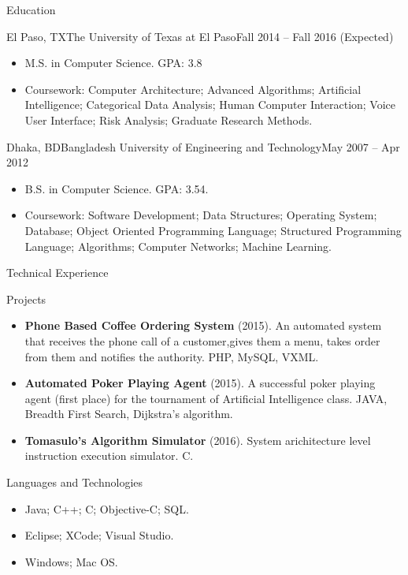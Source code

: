 \documentclass[]{mcdowellcv}
\begin{document}
	\begin{cvsection}{Education}
		\begin{cvsubsection}{El Paso, TX}{The University of Texas at El Paso}{Fall 2014 -- Fall 2016 (Expected)}
			\begin{itemize}
				\item M.S. in Computer Science. GPA: 3.8
				\item Coursework: Computer Architecture; Advanced Algorithms; Artificial Intelligence; Categorical Data Analysis; Human Computer Interaction; Voice User Interface; Risk Analysis; Graduate Research Methods.
			\end{itemize}
		\end{cvsubsection}

	\begin{cvsubsection}{Dhaka, BD}{Bangladesh University of Engineering and Technology}{May 2007 -- Apr 2012 }
			\begin{itemize}
				\item B.S. in Computer Science. GPA: 3.54.
				\item Coursework: Software Development; Data Structures; Operating System; Database; Object Oriented Programming Language; Structured Programming Language; Algorithms; Computer Networks; Machine Learning.
			\end{itemize}
		\end{cvsubsection}
	\end{cvsection}
	
	\begin{cvsection}{Technical Experience}
		\begin{cvsubsection}{Projects}{}{}
			\begin{itemize}
				\item \textbf{Phone Based Coffee Ordering System} (2015). An automated system that receives the phone call of a customer,gives them a menu, takes order from them and notifies the authority.  PHP, MySQL, VXML.
				\item \textbf{Automated Poker Playing Agent} (2015). A successful poker playing agent (first place) for the tournament of Artificial Intelligence class.  JAVA, Breadth First Search, Dijkstra's algorithm.
				\item \textbf{Tomasulo's Algorithm Simulator} (2016).  System arichitecture level instruction execution simulator. C.
			\end{itemize}
		\end{cvsubsection}
	\end{cvsection}
	
	
	\begin{cvsection}{Languages and Technologies}
		\begin{cvsubsection}{}{}{}	
			\begin{itemize}
				\item Java; C++; C; Objective-C; SQL.  
				\item Eclipse; XCode; Visual Studio.
				\item Windows; Mac OS. 
			\end{itemize}
		\end{cvsubsection}
	\end{cvsection}
	
\end{document}

